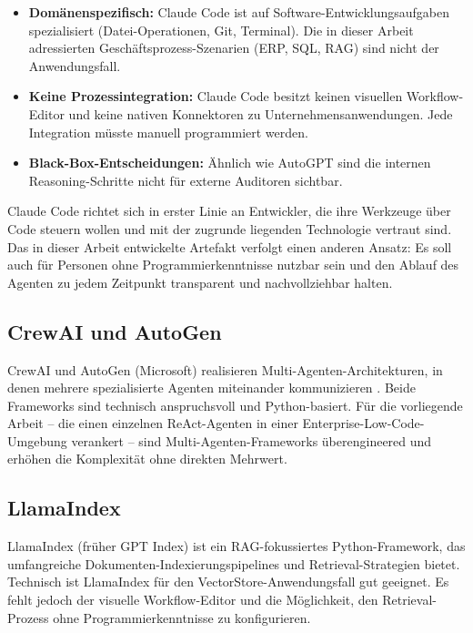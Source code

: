 \documentclass[12pt,a4paper,oneside]{report}
\begin{document}
\begin{itemize}
  \item \textbf{Domänenspezifisch:} Claude Code ist auf Software-Entwicklungsaufgaben
    spezialisiert (Datei-Operationen, Git, Terminal). Die in dieser Arbeit adressierten
    Geschäftsprozess-Szenarien (ERP, SQL, RAG) sind nicht der Anwendungsfall.
  \item \textbf{Keine Prozessintegration:} Claude Code besitzt keinen visuellen
    Workflow-Editor und keine nativen Konnektoren zu Unternehmensanwendungen. Jede
    Integration müsste manuell programmiert werden.
  \item \textbf{Black-Box-Entscheidungen:} Ähnlich wie AutoGPT sind die internen
    Reasoning-Schritte nicht für externe Auditoren sichtbar.
\end{itemize}

Claude Code richtet sich in erster Linie an Entwickler, die ihre Werkzeuge über
Code steuern wollen und mit der zugrunde liegenden Technologie vertraut sind.
Das in dieser Arbeit entwickelte Artefakt verfolgt einen anderen Ansatz: Es soll
auch für Personen ohne Programmierkenntnisse nutzbar sein und den Ablauf des
Agenten zu jedem Zeitpunkt transparent und nachvollziehbar halten.

\subsection{CrewAI und AutoGen}

CrewAI und AutoGen (Microsoft) realisieren Multi-Agenten-Architekturen, in denen
mehrere spezialisierte Agenten miteinander kommunizieren \cite{wang2023survey}. Beide
Frameworks sind technisch anspruchsvoll und Python-basiert. Für die vorliegende Arbeit
-- die einen einzelnen ReAct-Agenten in einer Enterprise-Low-Code-Umgebung verankert
-- sind Multi-Agenten-Frameworks überengineered und erhöhen die Komplexität ohne
direkten Mehrwert.

\subsection{LlamaIndex}

LlamaIndex (früher GPT Index) ist ein \ac{RAG}-fokussiertes Python-Framework, das
umfangreiche Dokumenten-Indexierungspipelines und Retrieval-Strategien bietet.
Technisch ist LlamaIndex für den VectorStore-Anwendungsfall gut geeignet. Es fehlt
jedoch der visuelle Workflow-Editor und die Möglichkeit, den Retrieval-Prozess ohne
Programmierkenntnisse zu konfigurieren.
\end{document}
